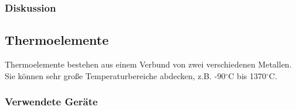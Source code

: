 \documentclass[12pt,a4paper]{article}
\begin{document}
\subsubsection*{Diskussion}












\subsection{Thermoelemente}

Thermoelemente bestehen aus einem Verbund von zwei verschiedenen Metallen. Sie können sehr große Temperaturbereiche abdecken, z.B. -90$^\circ$C bis 1370$^\circ$C.

\subsubsection*{Verwendete Geräte}
\end{document}
